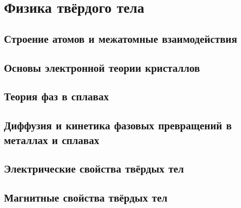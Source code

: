 \chapter{Физика твёрдого тела}\label{ch:sst}


\section{Строение атомов и межатомные взаимодействия}\label{sec:atoms}







\section{Основы электронной теории кристаллов}\label{sec:electrons}



\section{Теория фаз в сплавах}\label{sec:phases}



\section{Диффузия и кинетика фазовых превращений в металлах и сплавах}\label{sec:diffusion}






\section{Электрические свойства твёрдых тел}\label{sec:electric}





\section{Магнитные свойства твёрдых тел}\label{sec:magnetic}



